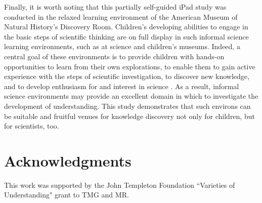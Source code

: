 \documentclass[man,floatsintext]{apa6}
\begin{document}
Finally, it is worth noting that this partially self-guided iPad study was conducted in the relaxed learning environment of the American Museum of Natural History's Discovery Room. 
Children's developing abilities to engage in the basic steps of scientific 
 thinking are on full display in such informal science learning environments, such as at 
science and children's museums. Indeed, a central goal of these environments is to 
provide children with hands-on opportunities to learn from their own explorations, to 
enable them to gain active experience with the steps of scientific investigation, to 
discover new knowledge, and to develop enthusiasm for and interest in science 
\cite{Bell:2009,Fenichel:2010}. As a result, informal science 
environments may provide an excellent domain in which to investigate the development of understanding. This study demonstrates that such environs can be suitable and fruitful venues for knowledge discovery not only for children, but for scientists, too.

\section{Acknowledgments}

This work was supported by the John Templeton Foundation 
``Varieties of Understanding" grant to TMG and MR.





\end{document}
